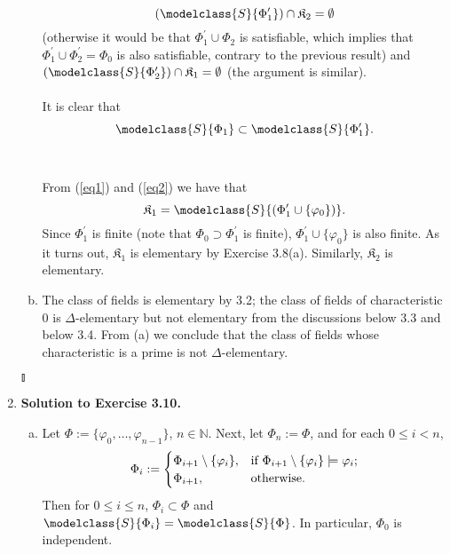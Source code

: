 \begin{enumerate}[1.]
\begin{enumerate}[(a)]
\begin{equation}
(\modelclass{S}{\Phi_1^\prime}) \cap \mathfrak{K}_2 = \emptyset \label{eq1}
\end{equation}
(otherwise it would be that $\Phi_1^\prime \cup \Phi_2$ is satisfiable, which implies that $\Phi_1^\prime \cup \Phi_2^\prime = \Phi_0$ is also satisfiable, contrary to the previous result) and $(\modelclass{S}{\Phi_2^\prime}) \cap \mathfrak{K}_1 = \emptyset$ (the argument is similar).\\
\\
It is clear that
\begin{equation}
\modelclass{S}{\Phi_1} \subset \modelclass{S}{\Phi_1^\prime}. \label{eq2}
\end{equation}\\
\\
From (\ref{eq1}) and (\ref{eq2}) we have that
\[
\mathfrak{K}_1 = \modelclass{S}{(\Phi_1^\prime \cup \{ \varphi_0 \})}.
\]
Since $\Phi_1^\prime$ is finite (note that $\Phi_0 \supset \Phi_1^\prime$ is finite), $\Phi_1^\prime \cup \{ \varphi_0 \}$ is also finite. As it turns out, $\mathfrak{K}_1$ is elementary by Exercise 3.8(a). Similarly, $\mathfrak{K}_2$ is elementary.
\item The class of fields is elementary by 3.2; the class of fields of characteristic $0$ is $\Delta$-elementary but not elementary from the discussions below 3.3 and below 3.4. From (a) we conclude that the class of fields whose characteristic is a prime is not $\Delta$-elementary.
\end{enumerate} \begin{flushright}$\talloblong$\end{flushright}
%
\item \textbf{Solution to Exercise 3.10.}
\begin{enumerate}[(a)]
\item Let $\Phi := \{ \varphi_0, \ldots, \varphi_{n-1} \}$, $n \in \mathbb{N}$. Next, let $\Phi_n := \Phi$, and for each $0 \leq i < n$,
\[
\Phi_i := \begin{cases} \Phi_{i+1} \setminus \{ \varphi_i \}, & \mbox{if \(\Phi_{i+1} \setminus \{ \varphi_i \} \models \varphi_i\);} \cr
\Phi_{i+1}, & \mbox{otherwise.}
\end{cases}
\]
Then for $0 \leq i \leq n$, $\Phi_i \subset \Phi$ and $\modelclass{S}{\Phi_i} = \modelclass{S}{\Phi}$. In particular, $\Phi_0$ is independent.

\end{enumerate}
\end{enumerate}
